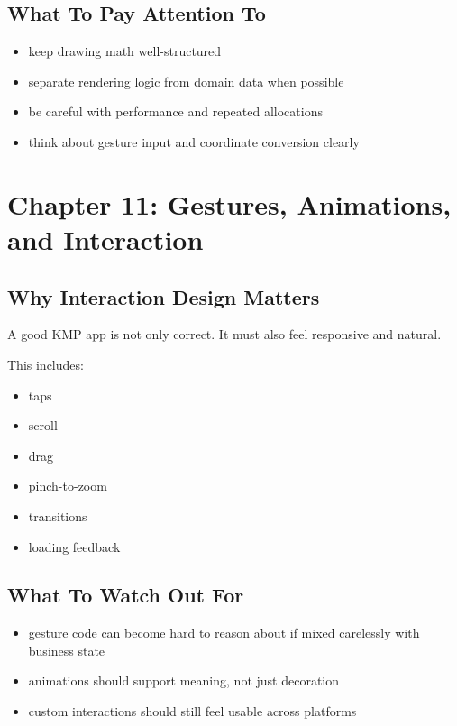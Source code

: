 \documentclass[11pt,a4paper]{article}
\begin{document}
\subsection{What To Pay Attention To}

\begin{itemize}
    \item keep drawing math well-structured
    \item separate rendering logic from domain data when possible
    \item be careful with performance and repeated allocations
    \item think about gesture input and coordinate conversion clearly
\end{itemize}

\section{Chapter 11: Gestures, Animations, and Interaction}

\subsection{Why Interaction Design Matters}

A good KMP app is not only correct. It must also feel responsive and natural.

This includes:
\begin{itemize}
    \item taps
    \item scroll
    \item drag
    \item pinch-to-zoom
    \item transitions
    \item loading feedback
\end{itemize}

\subsection{What To Watch Out For}

\begin{itemize}
    \item gesture code can become hard to reason about if mixed carelessly with business state
    \item animations should support meaning, not just decoration
    \item custom interactions should still feel usable across platforms
\end{itemize}
\end{document}
